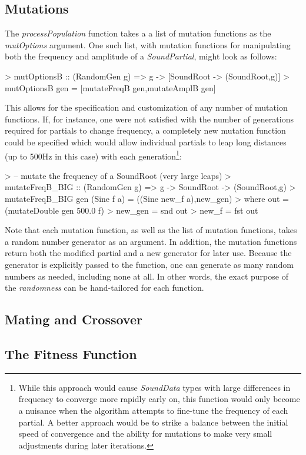 \documentclass[11pt]{article}
\begin{document}
\subsection{Mutations}
The \emph{processPopulation} function takes a a list of mutation functions as the \emph{mutOptions} argument. One such list, with mutation functions for manipulating both the frequency and amplitude of a \emph{SoundPartial}, might look as follows:
\begin{code}
> mutOptionsB :: (RandomGen g) => g -> [SoundRoot -> (SoundRoot,g)]
> mutOptionsB gen = [mutateFreqB gen,mutateAmplB gen]
\end{code}
This allows for the specification and customization of any number of mutation functions. If, for instance, one were not satisfied with the number of generations required for partials to change frequency, a completely new mutation function could be specified which would allow individual partials to leap long distances (up to 500Hz in this case) with each generation\footnote{While this approach would cause \emph{SoundData} types with large differences in frequency to converge more rapidly early on, this function would only become a nuisance when the algorithm attempts to fine-tune the frequency of each partial. A better approach would be to strike a balance between the initial speed of convergence and the ability for mutations to make very small adjustments during later iterations.}:
\begin{code}
> -- mutate the frequency of a SoundRoot (very large leaps)
> mutateFreqB_BIG :: (RandomGen g) => g -> SoundRoot -> (SoundRoot,g)
> mutateFreqB_BIG gen (Sine f a) = ((Sine new_f a),new_gen)
>   where out = (mutateDouble gen 500.0 f)
>         new_gen = snd out
>         new_f = fst out
\end{code}
Note that each mutation function, as well as the list of mutation functions, takes a random number generator as an argument. In addition, the mutation functions return both the modified partial and a new generator for later use. Because the generator is explicitly passed to the function, one can generate as many random numbers as needed, including none at all. In other words, the exact purpose of the \emph{randomness} can be hand-tailored for each function.
\subsection{Mating and Crossover}

\subsection{The Fitness Function}
\end{document}
